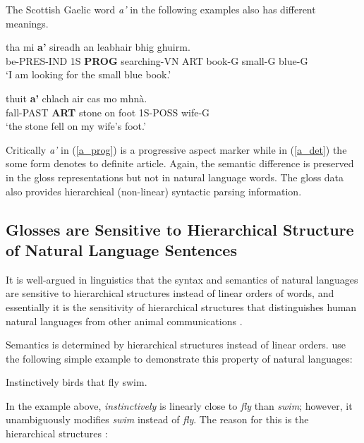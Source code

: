The Scottish Gaelic word \textit{a'} in the following examples also has different meanings.  

\begin{exe}  
\ex \label{a_prog}
\gll tha mi \textbf{a'} sireadh an leabhair bhig ghuirm.\\
be-PRES-IND 1S \textbf{PROG} searching-VN ART book-G small-G blue-G\\
\glt `I am looking for the small blue book.' \citep[p. 29]{lamb2001scottish}

\ex \label{a_det}
\gll thuit \textbf{a'} chlach air cas mo mhn\`a.\\
fall-PAST \textbf{ART} stone on foot 1S-POSS wife-G\\
\glt`the stone fell on my wife's foot.' \citep[p. 30]{lamb2001scottish} 	
\end{exe}

Critically \textit{a'} in (\ref{a_prog}) is a progressive aspect marker while in (\ref{a_det}) the some form denotes to definite article. Again, the semantic difference is preserved in the gloss representations but not in natural language words.  
The gloss data also provides hierarchical (non-linear) syntactic parsing information. 

\subsection{Glosses are Sensitive to Hierarchical Structure of Natural Language Sentences}

It is well-argued in linguistics that the syntax and semantics of natural languages are sensitive to hierarchical structures instead of linear orders of words, and essentially it is the sensitivity of hierarchical structures that distinguishes human natural languages from other animal communications \citep{berwick2015only}.     

Semantics is determined by hierarchical structures instead of linear orders. \citet[p. 117]{berwick2015only} use the following simple example to demonstrate this property of natural languages:

\begin{exe}
\ex Instinctively birds that fly swim. 
\end{exe}

In the example above, \textit{instinctively} is linearly close to \textit{fly} than \textit{swim}; however, it unambiguously modifies \textit{swim} instead of \textit{fly}. The reason for this is the hierarchical structures \citep[p. 117]{berwick2015only}:

